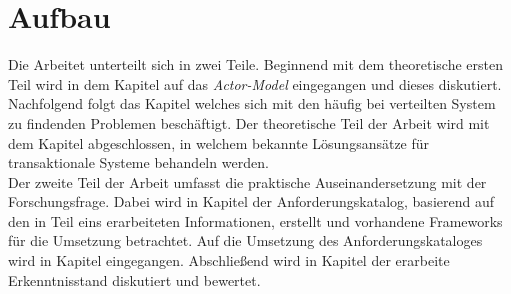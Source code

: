 \section{Aufbau}
Die Arbeitet unterteilt sich in zwei Teile. Beginnend mit dem theoretische ersten Teil wird in dem Kapitel  auf das \textit{Actor-Model} eingegangen und dieses diskutiert. Nachfolgend folgt das Kapitel  welches sich mit den häufig bei verteilten System zu findenden Problemen beschäftigt. Der theoretische Teil der Arbeit wird mit dem Kapitel  abgeschlossen, in welchem bekannte Lösungsansätze für transaktionale Systeme behandeln werden. \\
Der zweite Teil der Arbeit umfasst die praktische Auseinandersetzung mit der Forschungsfrage. Dabei wird in Kapitel  der Anforderungskatalog, basierend auf den in Teil eins erarbeiteten Informationen, erstellt und vorhandene Frameworks für die Umsetzung betrachtet. Auf die Umsetzung des Anforderungskataloges wird in Kapitel  eingegangen. Abschließend wird in Kapitel  der erarbeite Erkenntnisstand diskutiert und bewertet.  